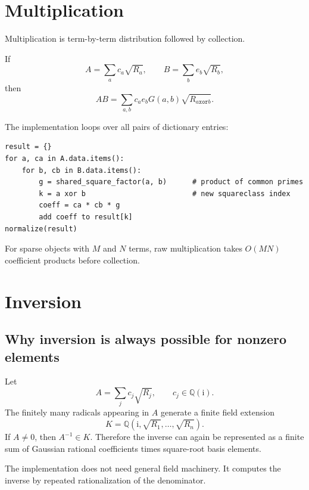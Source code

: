 \documentclass[11pt]{article}
\newcommand{\QQ}{\mathbb{Q}}
\newcommand{\ii}{\mathrm{i}}
\newcommand{\xor}{\mathbin{\mathtt{xor}}}
\begin{document}
\section{Multiplication}

Multiplication is term-by-term distribution followed by collection.

If
\begin{equation}
  A=\sum_a c_a\sqrt{R_a},\qquad
  B=\sum_b e_b\sqrt{R_b},
\end{equation}
then
\begin{equation}
  AB=\sum_{a,b} c_a e_b G(a,b)\sqrt{R_{a\xor b}}.
\end{equation}

The implementation loops over all pairs of dictionary entries:
\begin{lstlisting}
result = {}
for a, ca in A.data.items():
    for b, cb in B.data.items():
        g = shared_square_factor(a, b)      # product of common primes
        k = a xor b                         # new squareclass index
        coeff = ca * cb * g
        add coeff to result[k]
normalize(result)
\end{lstlisting}

For sparse objects with \(M\) and \(N\) terms, raw multiplication takes \(O(MN)\) coefficient products before collection.

\section{Inversion}

\subsection{Why inversion is always possible for nonzero elements}

Let
\begin{equation}
  A=\sum_j c_j\sqrt{R_j}, \qquad c_j\in\QQ(\ii).
\end{equation}
The finitely many radicals appearing in \(A\) generate a finite field extension
\begin{equation}
  K=\QQ(\ii,\sqrt{R_1},\ldots,\sqrt{R_n}).
\end{equation}
If \(A\neq 0\), then \(A^{-1}\in K\). Therefore the inverse can again be represented as a finite sum of Gaussian rational coefficients times square-root basis elements.

The implementation does not need general field machinery. It computes the inverse by repeated rationalization of the denominator.
\end{document}

